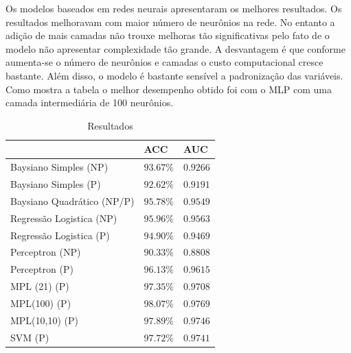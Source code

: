 \documentclass[11pt,a4paper]{article}
\numberwithin{equation}{section}
\begin{document}
Os modelos baseados em redes neurais apresentaram os melhores resultados. Os resultados melhoravam com maior número de neurônios na rede. No entanto a adição de mais camadas não trouxe melhoras tão significativas pelo fato de o modelo não apresentar complexidade tão grande.  A desvantagem é que conforme aumenta-se o número de neurônios e camadas o custo computacional cresce bastante. Além disso, o modelo é bastante sensível a padronização das variáveis. Como mostra a tabela o melhor desempenho obtido foi com o MLP com uma camada intermediária de 100 neurônios.

\begin{table}[H]
\centering
\caption{Resultados}
\label{tab:results}
\begin{tabular}{l l l} \hline
 & \textbf{ACC} & \textbf{AUC}\\
\hline
Baysiano Simples (NP)      & $93.67\%$          & $0.9266$          \\ 
Baysiano Simples (P)       & $92.62\%$          & $0.9191$          \\ 
Baysiano Quadrático (NP/P) & $95.78\%$          & $0.9549$          \\ 
Regressão Logistica (NP)   & $95.96\%$          & $0.9563$          \\ 
Regressão Logistica (P)    & $94.90\%$          & $0.9469$          \\ 
Perceptron (NP)            & $90.33\%$          & $0.8808$          \\ 
Perceptron (P)             & $96.13\%$          & $0.9615$          \\ 
MPL (21) (P)               & $97.35\%$          & $0.9708$          \\ 
MPL(100) (P)               & \textbf{$98.07\%$} & \textbf{$0.9769$} \\ 
MPL(10,10) (P)             & $97.89\%$          & $0.9746$          \\ 
SVM (P)                    & $97.72\%$          & $0.9741$          \\ 
\hline
\end{tabular}
\end{table}
\end{document}
